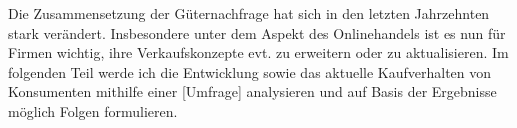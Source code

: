 Die Zusammensetzung der Güternachfrage hat sich in den letzten Jahrzehnten stark verändert. Insbesondere unter dem Aspekt des Onlinehandels ist es nun für Firmen wichtig, ihre Verkaufskonzepte evt. zu erweitern oder zu aktualisieren. Im folgenden Teil werde ich die Entwicklung sowie das aktuelle Kaufverhalten von Konsumenten mithilfe einer [Umfrage] analysieren und auf Basis der Ergebnisse möglich Folgen formulieren.
